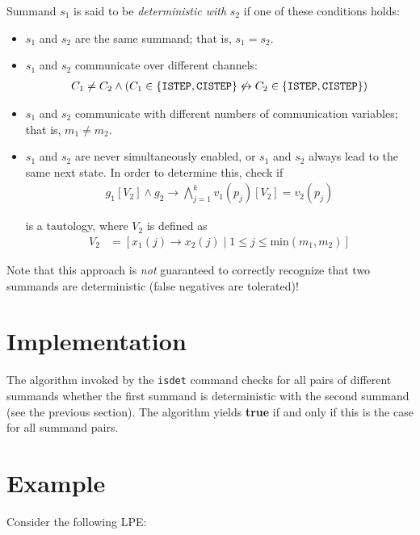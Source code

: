 Summand $s_1$ is said to be \emph{deterministic with} $s_2$ if one of these conditions holds:

\begin{itemize}
\item $s_1$ and $s_2$ are the same summand; that is, $s_1 = s_2$.

\item $s_1$ and $s_2$ communicate over different channels:
\begin{align*}
C_1 \neq C_2 \land (C_1 \in \{\texttt{ISTEP}{}, \texttt{CISTEP}{}\} \not\leftrightarrow C_2 \in \{\texttt{ISTEP}{}, \texttt{CISTEP}{}\})
\end{align*}

\item $s_1$ and $s_2$ communicate with different numbers of communication variables; that is, $m_1 \neq m_2$.

\item $s_1$ and $s_2$ are never simultaneously enabled, or $s_1$ and $s_2$ always lead to the same next state.
In order to determine this, check if
\begin{align*}
g_1[V_2] \land g_2 \rightarrow \bigwedge\limits_{j=1}^{k} v_1(p_j)[V_2] = v_2(p_j)
\end{align*}

is a tautology, where $V_2$ is defined as
\begin{align*}
V_{2} &= [x_1(j) \rightarrow x_2(j) \;|\; 1 \leq j \leq \text{min}(m_1, m_2)]
\end{align*}
\end{itemize}

Note that this approach is \emph{not} guaranteed to correctly recognize that two summands are deterministic (false negatives are tolerated)!

\section{Implementation}

The algorithm invoked by the \texttt{isdet} command checks for all pairs of different summands whether the first summand is deterministic with the second summand (see the previous section).
The algorithm yields \textbf{true} if and only if this is the case for all summand pairs.

\section{Example}

Consider the following LPE:

